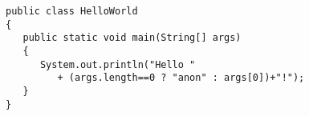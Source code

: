 \lstset{language=Java}
\begin{lstlisting}
public class HelloWorld
{ 
   public static void main(String[] args)
   {
      System.out.println("Hello "
         + (args.length==0 ? "anon" : args[0])+"!");
   }
}
\end{lstlisting}  
